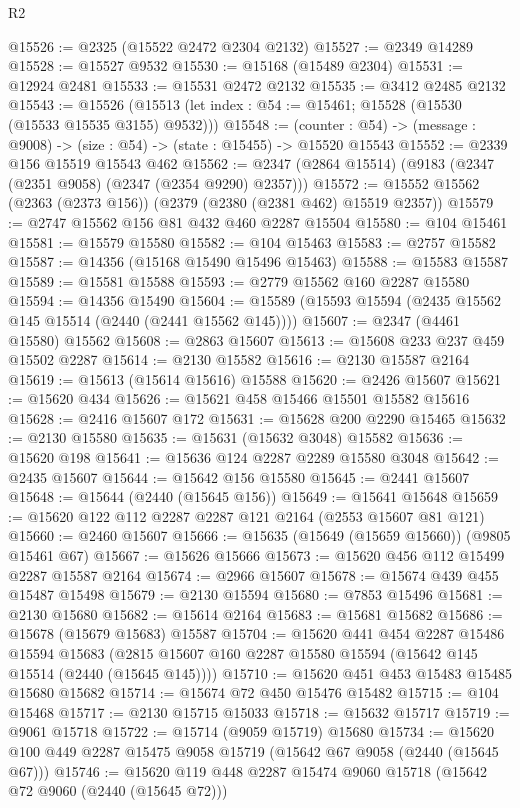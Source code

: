 \begin{lexlean}{R2}
\begin{coremodule}
@15526 := @2325 (@15522 @2472 @2304 @2132)
@15527 := @2349 @14289
@15528 := @15527 @9532
@15530 := @15168 (@15489 @2304)
@15531 := @12924 @2481
@15533 := @15531 @2472 @2132
@15535 := @3412 @2485 @2132
@15543 := @15526 (@15513 (let index : @54 := @15461; @15528 (@15530 (@15533 @15535 @3155) @9532)))
@15548 := (counter : @54) -> (message : @9008) -> (size : @54) -> (state : @15455) -> @15520 @15543
@15552 := @2339 @156 @15519 @15543 @462
@15562 := @2347 (@2864 @15514) (@9183 (@2347 (@2351 @9058) (@2347 (@2354 @9290) @2357)))
@15572 := @15552 @15562 (@2363 (@2373 @156)) (@2379 (@2380 (@2381 @462) @15519 @2357))
@15579 := @2747 @15562 @156 @81 @432 @460 @2287 @15504
@15580 := @104 @15461
@15581 := @15579 @15580
@15582 := @104 @15463
@15583 := @2757 @15582
@15587 := @14356 (@15168 @15490 @15496 @15463)
@15588 := @15583 @15587
@15589 := @15581 @15588
@15593 := @2779 @15562 @160 @2287 @15580
@15594 := @14356 @15490
@15604 := @15589 (@15593 @15594 (@2435 @15562 @145 @15514 (@2440 (@2441 @15562 @145))))
@15607 := @2347 (@4461 @15580) @15562
@15608 := @2863 @15607
@15613 := @15608 @233 @237 @459 @15502 @2287
@15614 := @2130 @15582
@15616 := @2130 @15587 @2164
@15619 := @15613 (@15614 @15616) @15588
@15620 := @2426 @15607
@15621 := @15620 @434
@15626 := @15621 @458 @15466 @15501 @15582 @15616
@15628 := @2416 @15607 @172
@15631 := @15628 @200 @2290 @15465
@15632 := @2130 @15580
@15635 := @15631 (@15632 @3048) @15582
@15636 := @15620 @198
@15641 := @15636 @124 @2287 @2289 @15580 @3048
@15642 := @2435 @15607
@15644 := @15642 @156 @15580
@15645 := @2441 @15607
@15648 := @15644 (@2440 (@15645 @156))
@15649 := @15641 @15648
@15659 := @15620 @122 @112 @2287 @2287 @121 @2164 (@2553 @15607 @81 @121)
@15660 := @2460 @15607
@15666 := @15635 (@15649 (@15659 @15660)) (@9805 @15461 @67)
@15667 := @15626 @15666
@15673 := @15620 @456 @112 @15499 @2287 @15587 @2164
@15674 := @2966 @15607
@15678 := @15674 @439 @455 @15487 @15498
@15679 := @2130 @15594
@15680 := @7853 @15496
@15681 := @2130 @15680
@15682 := @15614 @2164
@15683 := @15681 @15682
@15686 := @15678 (@15679 @15683) @15587
@15704 := @15620
    @441
    @454
    @2287
    @15486
    @15594
    @15683
    (@2815 @15607 @160 @2287 @15580 @15594 (@15642 @145 @15514 (@2440 (@15645 @145))))
@15710 := @15620 @451 @453 @15483 @15485 @15680 @15682
@15714 := @15674 @72 @450 @15476 @15482
@15715 := @104 @15468
@15717 := @2130 @15715 @15033
@15718 := @15632 @15717
@15719 := @9061 @15718
@15722 := @15714 (@9059 @15719) @15680
@15734 := @15620 @100 @449 @2287 @15475 @9058 @15719 (@15642 @67 @9058 (@2440 (@15645 @67)))
@15746 := @15620 @119 @448 @2287 @15474 @9060 @15718 (@15642 @72 @9060 (@2440 (@15645 @72)))

\end{coremodule}
\end{lexlean}
